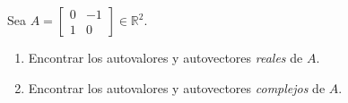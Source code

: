 \documentclass[handout]{beamer} %
\newcommand{\Id}{\operatorname{Id}}
\newcommand{\R}{\mathbb R}
\begin{document}
    
    \begin{frame}

    \begin{ejemplo} \label{ejemplo-autovalores-complejos}
    Sea $A= \begin{bmatrix}0&-1\\1&0\end{bmatrix} \in \R^2$. 
    \begin{enumerate}
        \item Encontrar los autovalores y  autovectores \textit{reales} de $A$.  
        \item Encontrar los autovalores y  autovectores \textit{complejos} de $A$.  
    \end{enumerate}
    
    \end{ejemplo}\pause
\end{frame}
\end{document}
